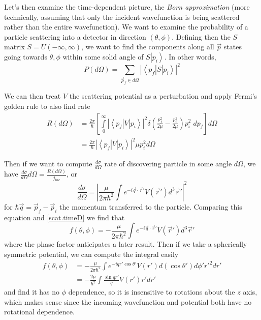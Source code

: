 \documentclass[10pt]{report}
\newcommand{\bra}[1]{\left<#1\right|}
\newcommand{\ket}[1]{\left|#1\right>}
\newcommand{\rd}[2]{\frac{d#1}{d#2}}
\newcommand{\abs}[1]{\left|#1\right|}
\begin{document}
Let's then examine the time-dependent picture, the \emph{Born approximation} (more technically, assuming that only the incident wavefunction is being scattered rather than the entire wavefunction). We want to examine the probability of a particle scattering into a detector in direction $(\theta,\phi)$. Defining then the $S$ matrix $S = U(-\infty,\infty)$, we want to find the components along all $\vec{p}$ states going towards $\theta,\phi$ within some solid angle of $S\ket{p_i}$. In other words,
\begin{equation}
    P(d\Omega) = \sum_{\vec{p}_f \in d\Omega}\abs{\bra{p_f}S\ket{p_i}}^2
\end{equation}

We can then treat $V$ the scattering potential as a perturbation and apply Fermi's golden rule to also find rate
\begin{align}
    R(d\Omega) &= \frac{2\pi}{\hbar}\left[ \displaystyle\int\limits_{0}^{\infty}\abs{\bra{p_f}V\ket{p_i}}^2\delta\left( \frac{p_f^2}{2\mu} - \frac{p_i^2}{2\mu} \right)p_i^2\;dp_f \right]d\Omega\\
    &= \frac{2\pi}{\hbar}\abs{\bra{p_f}V\ket{p_i}}^2\mu p_i^2 d\Omega
\end{align}

Then if we want to compute $\rd{\sigma}{\Omega}$ rate of discovering particle in some angle $d\Omega$, we have $\rd{\sigma}{\Omega}d\Omega = \frac{R(d\Omega)}{j_{inc}}$, or
\begin{equation}
    \rd{\sigma}{\Omega} = \abs{\frac{\mu}{2\pi\hbar^2}\int e^{-i\vec{q}\cdot \vec{r}'}V(\vec{r}')d^3\vec{r}'}^2
\end{equation}
for $\hbar\vec{q} = \vec{p}_f - \vec{p}_i$ the momentum transferred to the particle. Comparing this equation and \ref{scat.timeD} we find that
\begin{equation}
    f(\theta,\phi) = -\frac{\mu}{2\pi\hbar^2}\int e^{-i\vec{q}\cdot \vec{r}'}V(\vec{r}')d^3\vec{r}'
\end{equation}
where the phase factor anticipates a later result. Then if we take a spherically symmetric potential, we can compute the integral easily
\begin{align}
    f(\theta,\phi) &= -\frac{\mu}{2\pi\hbar^2}\int e^{-iqr'\cos\theta'}V(r')d(\cos \theta') d\phi' r'^2 dr'\\
    &= -\frac{2\mu}{\hbar^2}\int \frac{\sin qr'}{q}V(r') r' dr' \label{scat.radial}
\end{align}
and find it has no $\phi$ dependence, so it is insensitive to rotations about the $z$ axis, which makes sense since the incoming wavefunction and potential both have no rotational dependence.
\end{document}

